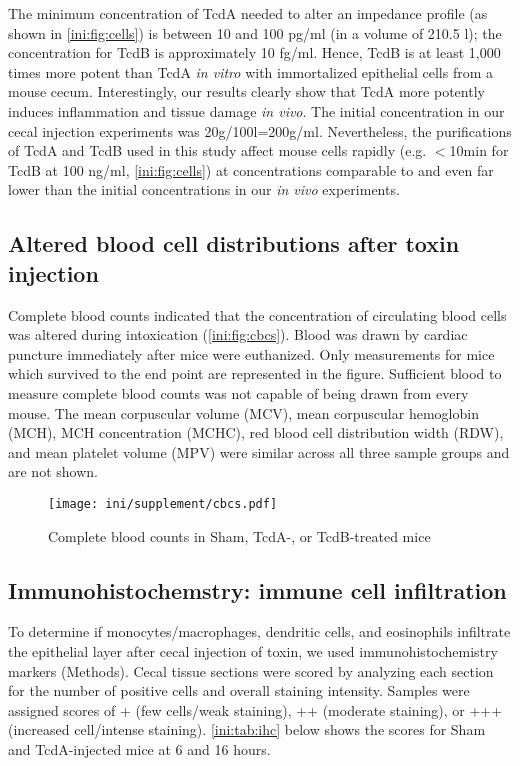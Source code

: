The minimum concentration of 
TcdA needed to alter an impedance profile (as shown in \autoref{ini:fig:cells}) is
between 10 and 100 pg/ml (in a volume of 210.5 \textmugreek{}l); the concentration for TcdB is 
approximately 10 fg/ml. 
Hence, TcdB is at least 1,000 times more potent than TcdA
\emph{in vitro} with immortalized epithelial cells from a mouse cecum. Interestingly, our results
clearly show that TcdA more potently induces inflammation and
tissue damage \emph{in vivo}. 
The initial concentration in our cecal injection experiments was 
20\textmugreek{}g/100\textmugreek{}l=200\textmugreek{}g/ml. 
Nevertheless, the purifications of TcdA and TcdB used
in this study affect mouse cells rapidly (e.g. $<$10min for TcdB at 100 ng/ml, 
\autoref{ini:fig:cells}) at concentrations comparable to and even far lower than 
the initial concentrations in our \emph{in vivo} experiments.

\subsection{Altered blood cell distributions after toxin injection}

Complete blood counts indicated that the concentration of circulating
blood cells was altered during intoxication (\autoref{ini:fig:cbcs}). 
Blood was drawn by cardiac puncture immediately after mice were euthanized.
Only measurements for mice which survived to the end point are represented
in the figure. Sufficient blood to measure complete blood counts was not 
capable of being drawn from every mouse. The mean corpuscular volume (MCV), 
mean corpuscular hemoglobin (MCH), MCH concentration (MCHC), red blood
cell distribution width (RDW), and mean platelet volume (MPV) were
similar across all three sample groups and are not shown.

\begin{figure}[ht]
\centering
\begin{adjustwidth}{-1cm}{}
\texttt{[image: ini/supplement/cbcs.pdf]}
\end{adjustwidth}
\caption{Complete blood counts in Sham, TcdA-, or TcdB-treated mice}
\label{ini:fig:cbcs}
\end{figure}

\subsection{Immunohistochemstry: immune cell infiltration}

To determine if monocytes/macrophages, dendritic cells, and eosinophils
infiltrate the epithelial layer after cecal injection of toxin, we used
immunohistochemistry markers (Methods). Cecal tissue sections were scored 
by analyzing each section for the number of positive cells and overall
staining intensity.  Samples were assigned scores of + (few cells/weak staining), 
++ (moderate staining), or +++ (increased cell/intense staining). \autoref{ini:tab:ihc}
below shows the scores for Sham and TcdA-injected mice at 6 and 16 hours.

